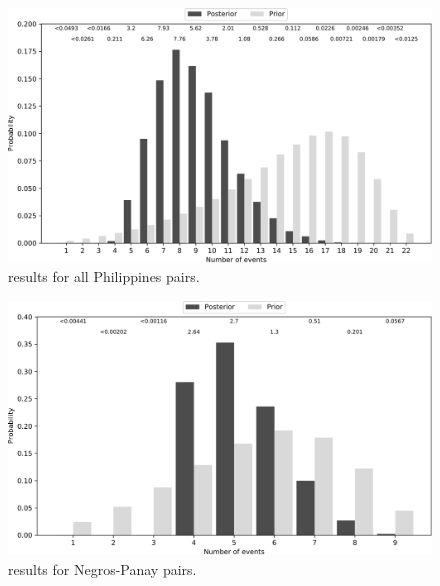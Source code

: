 \documentclass[letterpaper,12pt]{article}
\begin{document}
\begin{figure}[htbp]
    \begin{center}
        \includegraphics[width=\textwidth,height=\textheight,keepaspectratio]{../images/from-project-repo/empirical-plots/philippines-all-pairs/pyco-sumevents-philippines-all-pairs-pycoevolity-nevents-cropped.pdf}
        \caption{
            \Ecoevolity results for all Philippines pairs.
        }
        \label{fig:neventsphilall}
    \end{center}
\end{figure}

\begin{figure}[htbp]
    \begin{center}
        \includegraphics[width=\textwidth,height=\textheight,keepaspectratio]{../images/from-project-repo/empirical-plots/philippines-negros-panay-pairs/pyco-sumevents-philippines-negros-panay-pairs-pycoevolity-nevents-cropped.pdf}
        \caption{
            \Ecoevolity results for Negros-Panay pairs.
        }
        \label{fig:neventsphilnp}
    \end{center}
\end{figure}
\end{document}
